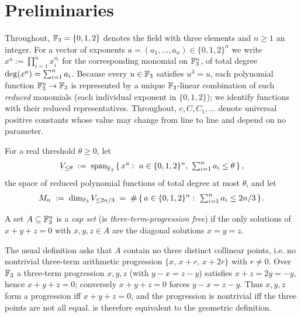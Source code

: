 \section{Preliminaries}\label{sec:prelim}

Throughout, $\mathbb{F}_3=\{0,1,2\}$ denotes the field with three elements and $n\ge 1$ an
integer. For a vector of exponents $a=(a_1,\dots,a_n)\in\{0,1,2\}^n$ we write
$x^a:=\prod_{i=1}^n x_i^{a_i}$ for the corresponding monomial on $\mathbb{F}_3^n$, of total
degree $\operatorname{deg}(x^a)=\sum_{i=1}^n a_i$. Because every $u\in\mathbb{F}_3$ satisfies $u^3=u$,
each polynomial function $\mathbb{F}_3^n\to\mathbb{F}_3$ is represented by a unique $\mathbb{F}_3$-linear
combination of such \emph{reduced} monomials (each individual exponent in
$\{0,1,2\}$); we identify functions with their reduced representatives. Throughout,
$c,C,C_1,\dots$ denote universal positive constants whose value may change from line
to line and depend on no parameter.

\begin{definition}\label{def:monomial-space}
For a real threshold $\theta\ge 0$, let
\begin{align*}
V_{\le\theta}\;:=\;\Span_{\F_3}\set{\,x^a:\ a\in\{0,1,2\}^n,\ \textstyle\sum_{i=1}^n a_i\le\theta\,},
\end{align*}
the space of reduced polynomial functions of total degree at most $\theta$, and let
\begin{align*}
M_n\;:=\;\dim_{\F_3} V_{\le 2n/3}\;=\;\#\set{\,a\in\{0,1,2\}^n:\ \textstyle\sum_{i=1}^n a_i\le 2n/3\,}.
\end{align*}
\end{definition}

\begin{definition}\label{def:cap-set}
A set $A\subseteq\mathbb{F}_3^n$ is a \emph{cap set} (is \emph{three-term-progression free})
if the only solutions of $x+y+z=0$ with $x,y,z\in A$ are the diagonal solutions
$x=y=z$.
\end{definition}

\begin{remark}\label{rem:cap-equiv}
The usual definition asks that $A$ contain no three distinct collinear points, i.e.
no nontrivial three-term arithmetic progression $\{x,\,x+r,\,x+2r\}$ with $r\ne 0$.
Over $\mathbb{F}_3$ a three-term progression $x,y,z$ (with $y-x=z-y$) satisfies
$x+z=2y=-y$, hence $x+y+z=0$; conversely $x+y+z=0$ forces $y-x=z-y$. Thus
$x,y,z$ form a progression iff $x+y+z=0$, and the progression is nontrivial iff the
three points are not all equal.  is therefore equivalent to the
geometric definition.
\end{remark}

